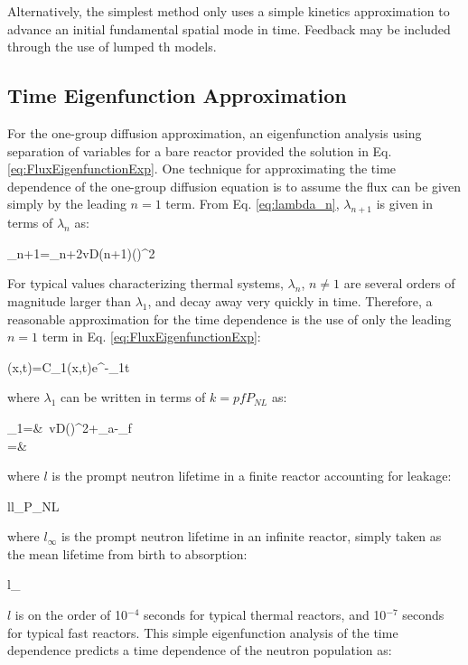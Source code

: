 Alternatively, the simplest method only uses a simple kinetics approximation to advance an initial fundamental spatial mode in time. Feedback may be included through the use of lumped \gls{th} models. 

\subsection{Time Eigenfunction Approximation}

For the one-group diffusion approximation, an eigenfunction analysis using separation of variables for a bare reactor provided the solution in Eq. \eqref{eq:FluxEigenfunctionExp}. One technique for approximating the time dependence of the one-group diffusion equation is to assume the flux can be given simply by the leading \(n=1\) term. From Eq. \eqref{eq:lambda_n}, \(\lambda_{n+1}\) is given in terms of \(\lambda_n\) as:

\beq
\lambda_{n+1}=\lambda_n+2vD(n+1)\left(\right)^2
\eeq

For typical values characterizing thermal systems, \(\lambda_{n}\), \(n\neq1\) are several orders of magnitude larger than \(\lambda_1\), and decay away very quickly in time. Therefore, a reasonable approximation for the time dependence is the use of only the leading \(n=1\) term in Eq. \eqref{eq:FluxEigenfunctionExp}:

\beq
\phi(x,t)=C_1(x,t)e^{-\lambda_1t}
\eeq

where \(\lambda_1\) can be written in terms of \(k=pfP_{NL}\) as:

\beqa
\lambda_1=&\ v\left\lbrack D\left(\right)^2+\Sigma_a-\nu\Sigma_f\right\rbrack\\
=&\ 
\eeqa

where \(l\) is the prompt neutron lifetime in a finite reactor accounting for leakage:

\beq
l\equiv l_\infty P_{NL}
\eeq

where \(l_\infty\) is the prompt neutron lifetime in an infinite reactor, simply taken as the mean lifetime from birth to absorption:

\beq
l_\infty\equiv{}
\eeq

\(l\) is on the order of 10$^{-4}$ seconds for typical thermal reactors, and 10$^{-7}$ seconds for typical fast reactors. This simple eigenfunction analysis of the time dependence predicts a time dependence of the neutron population as:

